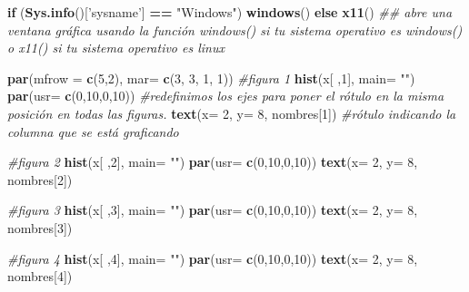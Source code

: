 \documentclass[]{book}
\newenvironment{Shaded}{\begin{snugshade}}{\end{snugshade}}
\newcommand{\CommentTok}[1]{\textcolor[rgb]{0.56,0.35,0.01}{\textit{#1}}}
\newcommand{\ControlFlowTok}[1]{\textcolor[rgb]{0.13,0.29,0.53}{\textbf{#1}}}
\newcommand{\DataTypeTok}[1]{\textcolor[rgb]{0.13,0.29,0.53}{#1}}
\newcommand{\DecValTok}[1]{\textcolor[rgb]{0.00,0.00,0.81}{#1}}
\newcommand{\KeywordTok}[1]{\textcolor[rgb]{0.13,0.29,0.53}{\textbf{#1}}}
\newcommand{\NormalTok}[1]{#1}
\newcommand{\OperatorTok}[1]{\textcolor[rgb]{0.81,0.36,0.00}{\textbf{#1}}}
\newcommand{\StringTok}[1]{\textcolor[rgb]{0.31,0.60,0.02}{#1}}
\begin{document}
\begin{Shaded}
\begin{Highlighting}[]
\ControlFlowTok{if}\NormalTok{ (}\KeywordTok{Sys.info}\NormalTok{()[}\StringTok{'sysname'}\NormalTok{] }\OperatorTok{==}\StringTok{ "Windows"}\NormalTok{) }\KeywordTok{windows}\NormalTok{() }\ControlFlowTok{else} \KeywordTok{x11}\NormalTok{() }\CommentTok{## abre una ventana gráfica usando la función windows() si tu sistema operativo es windows() o x11() si tu sistema operativo es linux}

\KeywordTok{par}\NormalTok{(}\DataTypeTok{mfrow =} \KeywordTok{c}\NormalTok{(}\DecValTok{5}\NormalTok{,}\DecValTok{2}\NormalTok{), }\DataTypeTok{mar=} \KeywordTok{c}\NormalTok{(}\DecValTok{3}\NormalTok{, }\DecValTok{3}\NormalTok{, }\DecValTok{1}\NormalTok{, }\DecValTok{1}\NormalTok{))}
\CommentTok{#figura 1}
\KeywordTok{hist}\NormalTok{(x[ ,}\DecValTok{1}\NormalTok{], }\DataTypeTok{main=} \StringTok{""}\NormalTok{)}
\KeywordTok{par}\NormalTok{(}\DataTypeTok{usr=} \KeywordTok{c}\NormalTok{(}\DecValTok{0}\NormalTok{,}\DecValTok{10}\NormalTok{,}\DecValTok{0}\NormalTok{,}\DecValTok{10}\NormalTok{)) }\CommentTok{#redefinimos los ejes para poner el rótulo en la misma posición en todas las figuras.}
\KeywordTok{text}\NormalTok{(}\DataTypeTok{x=} \DecValTok{2}\NormalTok{, }\DataTypeTok{y=} \DecValTok{8}\NormalTok{, nombres[}\DecValTok{1}\NormalTok{]) }\CommentTok{#rótulo indicando la columna que se está graficando}

\CommentTok{#figura 2}
\KeywordTok{hist}\NormalTok{(x[ ,}\DecValTok{2}\NormalTok{], }\DataTypeTok{main=} \StringTok{""}\NormalTok{)}
\KeywordTok{par}\NormalTok{(}\DataTypeTok{usr=} \KeywordTok{c}\NormalTok{(}\DecValTok{0}\NormalTok{,}\DecValTok{10}\NormalTok{,}\DecValTok{0}\NormalTok{,}\DecValTok{10}\NormalTok{))}
\KeywordTok{text}\NormalTok{(}\DataTypeTok{x=} \DecValTok{2}\NormalTok{, }\DataTypeTok{y=} \DecValTok{8}\NormalTok{, nombres[}\DecValTok{2}\NormalTok{])}

\CommentTok{#figura 3}
\KeywordTok{hist}\NormalTok{(x[ ,}\DecValTok{3}\NormalTok{], }\DataTypeTok{main=} \StringTok{""}\NormalTok{)}
\KeywordTok{par}\NormalTok{(}\DataTypeTok{usr=} \KeywordTok{c}\NormalTok{(}\DecValTok{0}\NormalTok{,}\DecValTok{10}\NormalTok{,}\DecValTok{0}\NormalTok{,}\DecValTok{10}\NormalTok{))}
\KeywordTok{text}\NormalTok{(}\DataTypeTok{x=} \DecValTok{2}\NormalTok{, }\DataTypeTok{y=} \DecValTok{8}\NormalTok{, nombres[}\DecValTok{3}\NormalTok{])}

\CommentTok{#figura 4}
\KeywordTok{hist}\NormalTok{(x[ ,}\DecValTok{4}\NormalTok{], }\DataTypeTok{main=} \StringTok{""}\NormalTok{)}
\KeywordTok{par}\NormalTok{(}\DataTypeTok{usr=} \KeywordTok{c}\NormalTok{(}\DecValTok{0}\NormalTok{,}\DecValTok{10}\NormalTok{,}\DecValTok{0}\NormalTok{,}\DecValTok{10}\NormalTok{))}
\KeywordTok{text}\NormalTok{(}\DataTypeTok{x=} \DecValTok{2}\NormalTok{, }\DataTypeTok{y=} \DecValTok{8}\NormalTok{, nombres[}\DecValTok{4}\NormalTok{])}


\end{Highlighting}
\end{Shaded}
\end{document}
